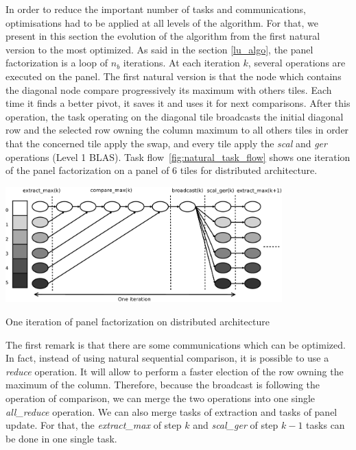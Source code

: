 In order to reduce the important number of tasks and communications, optimisations had to be applied at all levels of the algorithm. For that, we present in this section the evolution of the algorithm from the first natural version to the most optimized. As said in the section \ref{lu_algo}, the panel factorization is a loop of $n_b$ iterations. At each iteration $k$, several operations are executed on the panel.
The first natural version is that the node which contains the diagonal node compare progressively its maximum with others tiles. Each time it finds a better pivot, it saves it and uses it for next comparisons. After this operation, the task operating on the diagonal tile broadcasts the initial diagonal row and the selected row owning the column maximum to all others tiles in order that the concerned tile apply the swap, and every tile apply the \emph{scal} and \emph{ger} operations (Level 1 BLAS). Task flow~\ref{fig:natural_task_flow} shows one iteration of the panel factorization on a panel of 6 tiles for distributed architecture.

\begin{taskflow}[!ht]
\centering
\includegraphics[width=0.8\textwidth]{figures/natural_tf_bw.pdf}
\caption{One iteration of panel factorization on distributed architecture \label{fig:natural_task_flow}}
\end{taskflow}

The first remark is that there are some communications which can be optimized. In fact, instead of using natural sequential comparison, it is possible to use a \emph{reduce} operation. It will allow to perform a faster election of the row owning the maximum of the column. Therefore, because the broadcast is following the operation of comparison, we can merge the two operations into one single \emph{all\_reduce} operation.
We can also merge tasks of extraction and tasks of panel update. For that, the \emph{extract\_max} of step $k$ and \emph{scal\_ger} of step $k-1$ tasks can be done in one single task.

